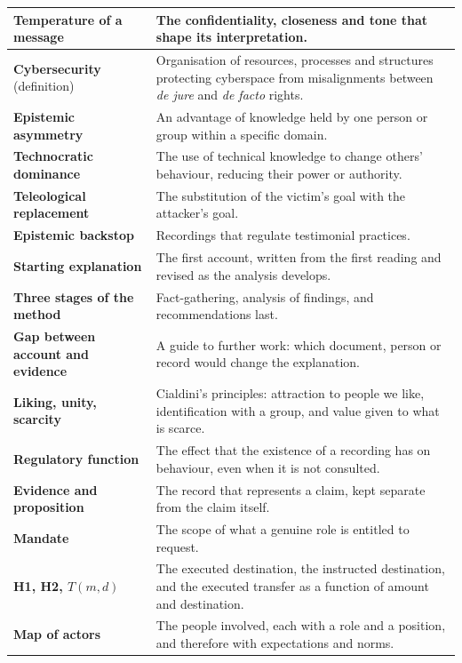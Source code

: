 \begin{table}[htbp]
\begin{tabular}{@{}>{\raggedright\arraybackslash}p{} >{\raggedright\arraybackslash}p{}@{}}
		\hline
		\textbf{Temperature of a message} & The confidentiality, closeness and tone that shape its interpretation. \\
		\hline
		\textbf{Cybersecurity} (definition) & Organisation of resources, processes and structures protecting cyberspace from misalignments between \emph{de jure} and \emph{de facto} rights. \\
		\hline
		\textbf{Epistemic asymmetry} & An advantage of knowledge held by one person or group within a specific domain. \\
		\hline
		\textbf{Technocratic dominance} & The use of technical knowledge to change others' behaviour, reducing their power or authority. \\
		\hline
		\textbf{Teleological replacement} & The substitution of the victim's goal with the attacker's goal. \\
		\hline
		\textbf{Epistemic backstop} & Recordings that regulate testimonial practices. \\
		\hline
		\textbf{Starting explanation} & The first account, written from the first reading and revised as the analysis develops. \\
		\hline
		\textbf{Three stages of the method} & Fact-gathering, analysis of findings, and recommendations last. \\
		\hline
		\textbf{Gap between account and evidence} & A guide to further work: which document, person or record would change the explanation. \\
		\hline
		\textbf{Liking, unity, scarcity} & Cialdini's principles: attraction to people we like, identification with a group, and value given to what is scarce. \\
			\hline
			\textbf{Regulatory function} & The effect that the existence of a recording has on behaviour, even when it is not consulted. \\
			\hline
			\textbf{Evidence and proposition} & The record that represents a claim, kept separate from the claim itself. \\
			\hline
			\textbf{Mandate} & The scope of what a genuine role is entitled to request. \\
			\hline
			\textbf{H1, H2, $T(m,d)$} & The executed destination, the instructed destination, and the executed transfer as a function of amount and destination. \\
			\hline
			\textbf{Map of actors} & The people involved, each with a role and a position, and therefore with expectations and norms. \\

\end{tabular}
\end{table}
